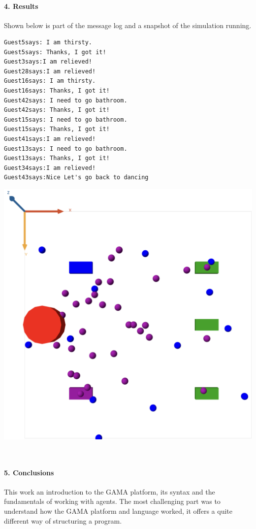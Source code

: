 \documentclass[a4paper,10pt]{article}
\begin{document}
\clearpage
\maketitle
\textbf
{\\\\4. Results\\\\}
Shown below is part of the message log and a snapshot of the simulation running. 
\begin{verbatim}
Guest5says: I am thirsty.
Guest5says: Thanks, I got it!
Guest3says:I am relieved!
Guest28says:I am relieved!
Guest16says: I am thirsty.
Guest16says: Thanks, I got it!
Guest42says: I need to go bathroom.
Guest42says: Thanks, I got it!
Guest15says: I need to go bathroom.
Guest15says: Thanks, I got it!
Guest41says:I am relieved!
Guest13says: I need to go bathroom.
Guest13says: Thanks, I got it!
Guest34says:I am relieved!
Guest43says:Nice Let's go back to dancing
\end{verbatim}

\begin{center}{}
\centering\includegraphics[scale=0.1]{Simulation.png}\par
\end{center}

\clearpage
\maketitle
\textbf
{\\\\5. Conclusions\\\\}
This work an introduction to the GAMA platform, its syntax and the fundamentals of working with agents. The most challenging part was to understand how the GAMA platform and language worked, it offers a quite different way of structuring a program. 
\end{document}
